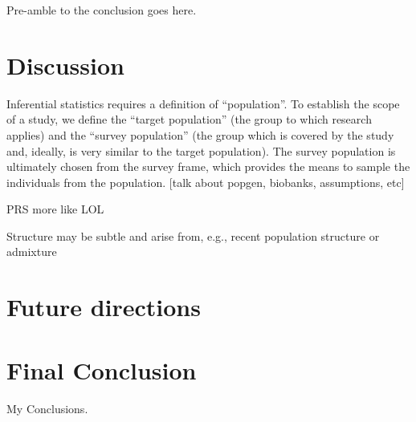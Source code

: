 Pre-amble to the conclusion goes here.

\section{Discussion}

Inferential statistics requires a definition of ``population''\citep{statcan2003}. To establish the scope of a study, we define the ``target population'' (the group to which research applies) and the ``survey population'' (the group which is covered by the study and, ideally, is very similar to the target population). The survey population is ultimately chosen from the survey frame, which provides the means to sample the individuals from the population. [talk about popgen, biobanks, assumptions, etc]

PRS more like LOL\citep{kaplan_polygenic_2022}

Structure may be subtle and arise from, e.g., recent population structure or admixture\citep{gopalan_human_2022}

\section{Future directions}

\section{Final Conclusion}
My Conclusions.